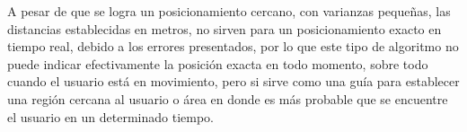 A pesar de que se logra un posicionamiento cercano, con varianzas pequeñas, las distancias establecidas en metros, no sirven para un posicionamiento exacto en tiempo real, debido a los errores presentados, por lo que este tipo de algoritmo no puede indicar efectivamente la posición exacta en todo momento, sobre todo cuando el usuario está en movimiento, pero si sirve como una guía para establecer una región cercana al usuario o área en donde es más probable que se encuentre el usuario en un determinado tiempo.